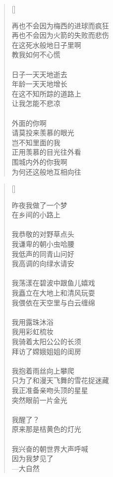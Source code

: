 \renewcommand{\poemtoc}{section}
\settowidth{\versewidth}{你的每一份努力}
\begin{verse}[\versewidth]

再也不会因为梅西的进球而疯狂\\
再也不会因为火箭的失败而悲伤\\
在这死水般地日子里啊\\
教我如何不心慌\\
~\\
日子一天天地逝去\\
年龄一天天地增长\\
在这不知所踪的道路上\\
让我怎能不悲凉\\
~\\
外面的你啊\\
请莫投来羡慕的眼光\\
岂不知里面的我\\
正用羡慕的目光往外看\\
围城内外的你我啊\\
为何还这般地互相向往
\end{verse}
\newpage

\renewcommand{\poemtoc}{section}
\settowidth{\versewidth}{昨夜我做了一个梦}
\begin{verse}[\versewidth]

昨夜我做了一个梦\\
在乡间的小路上\\
~\\
我恭敬的对野草点头\\
我谦卑的朝小虫哈腰\\
我低声的同青山问好\\
我高调的向绿水请安\\
~\\
我荡漾在碧波中跟鱼儿嬉戏\\
我矗立在大地上和清风玩耍\\
我偎依在天空里与白云缠绵\\
~\\
我用露珠沐浴\\
我用彩虹梳妆\\
我骑着太阳公公的长须\\
拜访了嫦娥姐姐的闺房\\
~\\
我抱着雨丝向上攀爬\\
只为了和漫天飞舞的雪花捉迷藏\\
我正准备亲吻头顶的星星\\
突然眼前一片金光\\
~\\
我醒了？\\
原来那是桔黄色的灯光\\
~\\
我兴奋的朝世界大声呼喊\\
因为我梦见了\\
\vin\vin---大自然
\end{verse}

